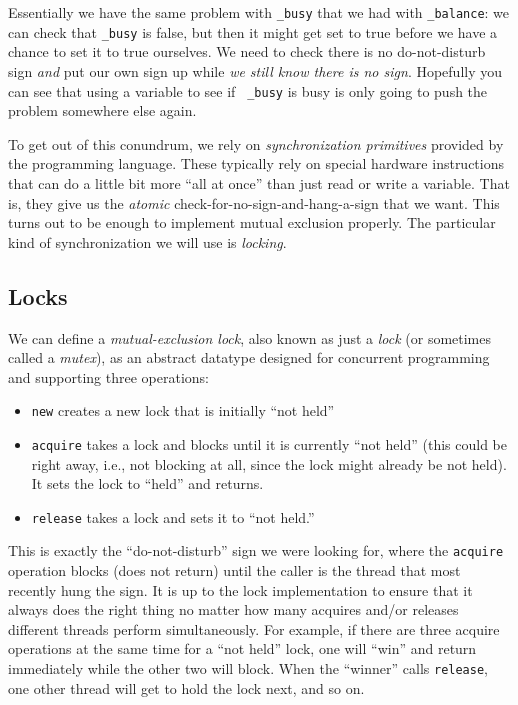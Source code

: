 \documentclass[10pt]{article}
\begin{document}
Essentially we have the same problem with {\tt \_busy} that we had with
{\tt \_balance}: we can check that {\tt \_busy} is false, but then it
might get set to true before we have a chance to set it to true
ourselves.  We need to check there is no do-not-disturb sign
\emph{and} put our own sign up while \emph{we still know there is no
  sign}.  Hopefully you can see that using a variable to see if {\tt
  \_busy} is busy is only going to push the problem somewhere else
again.

To get out of this conundrum, we rely on \emph{synchronization
  primitives} provided by the programming language.  These typically
rely on special hardware instructions that can do a little bit more
``all at once'' than just read or write a variable.  That is, they
give us the \emph{atomic} check-for-no-sign-and-hang-a-sign that we
want. This turns out to be enough to implement mutual exclusion
properly.  The particular kind of synchronization we will use is
\emph{locking}.

\subsection{Locks}
\label{sec:locks}

We can define a \emph{mutual-exclusion lock}, also known as just a
\emph{lock} (or sometimes called a \emph{mutex}), as an abstract
datatype designed for concurrent programming and supporting three
operations:
\begin{itemize}
\item {\tt new} creates a new lock that is initially ``not held''
\item {\tt acquire} takes a lock and blocks until it is currently
  ``not held'' (this could be right away, i.e., not blocking at all,
  since the lock might already be not held).  It sets the lock to
  ``held'' and returns.
\item {\tt release} takes a lock and sets it to ``not held.''
\end{itemize}
This is exactly the ``do-not-disturb'' sign we were looking for, where
the {\tt acquire} operation blocks (does not return) until the caller
is the thread that most recently hung the sign.  It is up to the lock
implementation to ensure that it always does the right thing no matter
how many acquires and/or releases different threads perform
simultaneously.  For example, if there are three acquire operations at
the same time for a ``not held'' lock, one will ``win'' and return
immediately while the other two will block.  When the ``winner'' calls
{\tt release}, one other thread will get to hold the lock next, and so on.
\end{document}
